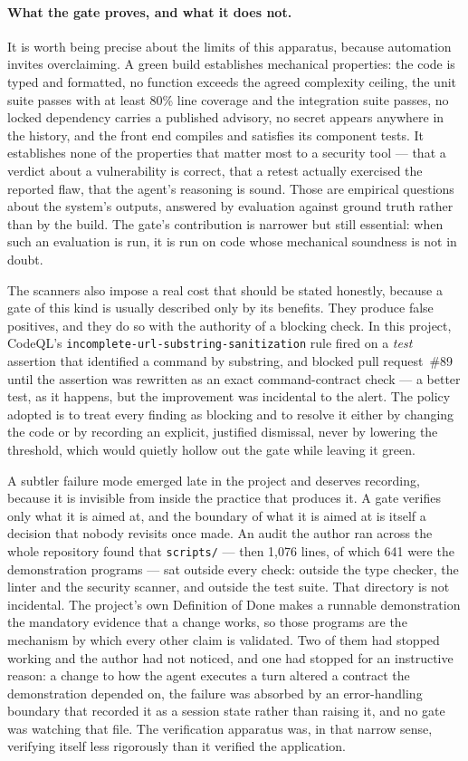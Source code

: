 \paragraph{What the gate proves, and what it does not.} It is worth being precise
about the limits of this apparatus, because automation invites overclaiming. A green
build establishes mechanical properties: the code is typed and formatted, no function
exceeds the agreed complexity ceiling, the unit suite passes with at least 80\% line
coverage and the integration suite passes, no locked dependency carries a published
advisory, no secret appears anywhere in the history, and the front end compiles and
satisfies its component tests. It establishes none of the properties that matter most
to a security tool --- that a verdict about a vulnerability is correct, that a retest
actually exercised the reported flaw, that the agent's reasoning is sound. Those are
empirical questions about the system's outputs, answered by evaluation against ground
truth rather than by the build. The gate's contribution is narrower but still
essential: when such an evaluation is run, it is run on code whose mechanical
soundness is not in doubt.

The scanners also impose a real cost that should be stated honestly, because a gate
of this kind is usually described only by its benefits. They produce false positives,
and they do so with the authority of a blocking check. In this project, CodeQL's
\texttt{incomplete-url-substring-sanitization} rule fired on a \emph{test} assertion
that identified a command by substring, and blocked pull request~\#89 until the
assertion was rewritten as an exact command-contract check --- a better test, as it
happens, but the improvement was incidental to the alert. The policy adopted is to
treat every finding as blocking and to resolve it either by changing the code or by
recording an explicit, justified dismissal, never by lowering the threshold, which
would quietly hollow out the gate while leaving it green.

A subtler failure mode emerged late in the project and deserves recording, because
it is invisible from inside the practice that produces it. A gate verifies only what
it is aimed at, and the boundary of what it is aimed at is itself a decision that
nobody revisits once made. An audit the author ran across the whole repository found
that \texttt{scripts/} --- then 1{,}076 lines, of which 641 were the demonstration
programs --- sat outside every check: outside the type checker, the linter and the
security scanner, and outside the test suite. That directory is not incidental. The
project's own Definition of Done makes a runnable demonstration the mandatory
evidence that a change works, so those programs are the mechanism by which every
other claim is validated. Two of them had stopped working and the author had not
noticed, and one had stopped for an instructive reason: a change to how the agent
executes a turn altered a contract the demonstration depended on, the failure was
absorbed by an error-handling boundary that recorded it as a session state rather
than raising it, and no gate was watching that file. The verification apparatus was,
in that narrow sense, verifying itself less rigorously than it verified the
application.


